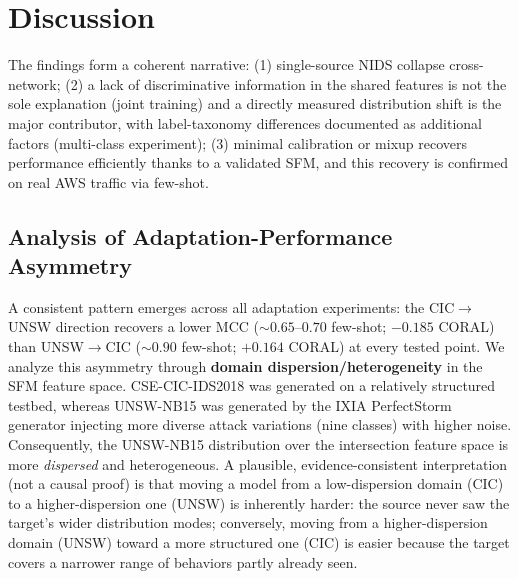 \documentclass[preprint,12pt,authoryear]{elsarticle}
\begin{document}
\section{Discussion}
\label{sec:discussion}

The findings form a coherent narrative: (1) single-source NIDS collapse
cross-network; (2) a lack of discriminative information in the shared features is
not the sole explanation (joint training) and a directly measured distribution
shift is the major contributor, with label-taxonomy differences documented as
additional factors (multi-class experiment);
(3) minimal calibration or mixup recovers performance efficiently thanks to a
validated SFM, and this recovery is confirmed on real AWS traffic via few-shot.

\subsection{Analysis of Adaptation-Performance Asymmetry}
\label{sec:asymmetry}
A consistent pattern emerges across all adaptation experiments: the
CIC$\rightarrow$UNSW direction recovers a lower MCC ($\sim 0.65$--$0.70$
few-shot; $-0.185$ CORAL) than UNSW$\rightarrow$CIC ($\sim 0.90$ few-shot;
$+0.164$ CORAL) at every tested point. We analyze this asymmetry through
\textbf{domain dispersion/heterogeneity} in the SFM feature space.
CSE-CIC-IDS2018 was generated on a relatively structured testbed, whereas
UNSW-NB15 was generated by the IXIA PerfectStorm generator injecting more diverse
attack variations (nine classes) with higher noise. Consequently, the UNSW-NB15
distribution over the intersection feature space is more \emph{dispersed} and
heterogeneous. A plausible, evidence-consistent interpretation (not a causal proof)
is that moving a model from a low-dispersion domain (CIC) to a higher-dispersion one
(UNSW) is inherently harder: the source never saw the target's wider distribution
modes; conversely, moving from a higher-dispersion domain (UNSW) toward a more
structured one (CIC) is easier because the target covers a narrower range of
behaviors partly already seen.
\end{document}
